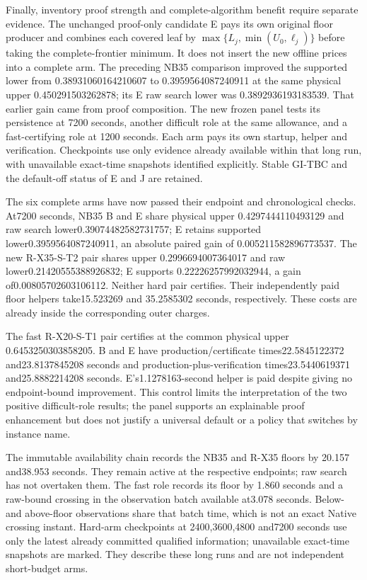 Finally, inventory proof strength and complete-algorithm benefit require
separate evidence. The unchanged proof-only candidate E pays its own
original floor producer and combines each covered leaf by
$\max\{L_j,\min(U_0,\ell_j)\}$ before taking the complete-frontier
minimum. It does not insert the new offline prices into a complete arm.
The preceding NB35 comparison improved the supported lower from
0.38931060164210607 to 0.3959564087240911 at the same physical upper
0.450291503262878; its E raw search lower was 0.3892936193183539.
That earlier gain came from proof composition. The new frozen panel
tests its persistence at 7200 seconds, another difficult role at the
same allowance, and a fast-certifying role at 1200 seconds. Each arm pays
its own startup, helper and verification. Checkpoints use only evidence
already available within that long run, with unavailable exact-time
snapshots identified explicitly. Stable GI-TBC and the default-off
status of E and J are retained.

The six complete arms have now passed their endpoint and chronological
checks. At7200 seconds, NB35 B and E share physical upper
0.4297444110493129 and raw search lower0.39074482582731757; E retains
supported lower0.3959564087240911, an absolute paired gain of
0.005211582896773537. The new R-X35-S-T2 pair shares upper
0.2996694007364017 and raw lower0.21420555388926832; E supports
0.22226257992032944, a gain of0.00805702603106112. Neither hard pair
certifies. Their independently paid floor helpers take15.523269 and
35.2585302 seconds, respectively. These costs are already inside the
corresponding outer charges.

The fast R-X20-S-T1 pair certifies at the common physical upper
0.6453250303858205. B and E have production/certificate times22.5845122372
and23.8137845208 seconds and production-plus-verification times23.5440619371
and25.8882214208 seconds. E's1.1278163-second helper is paid despite giving
no endpoint-bound improvement. This control limits the interpretation of
the two positive difficult-role results; the panel supports an explainable
proof enhancement but does not justify a universal default or a policy
that switches by instance name.

The immutable availability chain records the NB35 and R-X35 floors by
20.157 and38.953 seconds. They remain active at the respective endpoints;
raw search has not overtaken them. The fast role records its floor by
1.860 seconds and a raw-bound crossing in the observation batch available
at3.078 seconds. Below- and above-floor observations share that batch time,
which is not an exact Native crossing instant. Hard-arm checkpoints at
2400,3600,4800 and7200 seconds use only the latest already committed
qualified information; unavailable exact-time snapshots are marked.
They describe these long runs and are not independent short-budget arms.

